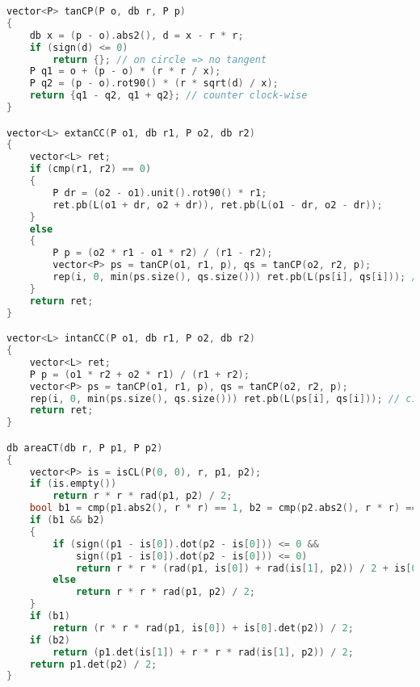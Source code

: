\begin{lstlisting}[language=C++]
vector<P> tanCP(P o, db r, P p)
{
    db x = (p - o).abs2(), d = x - r * r;
    if (sign(d) <= 0)
        return {}; // on circle => no tangent
    P q1 = o + (p - o) * (r * r / x);
    P q2 = (p - o).rot90() * (r * sqrt(d) / x);
    return {q1 - q2, q1 + q2}; // counter clock-wise
}

vector<L> extanCC(P o1, db r1, P o2, db r2)
{
    vector<L> ret;
    if (cmp(r1, r2) == 0)
    {
        P dr = (o2 - o1).unit().rot90() * r1;
        ret.pb(L(o1 + dr, o2 + dr)), ret.pb(L(o1 - dr, o2 - dr));
    }
    else
    {
        P p = (o2 * r1 - o1 * r2) / (r1 - r2);
        vector<P> ps = tanCP(o1, r1, p), qs = tanCP(o2, r2, p);
        rep(i, 0, min(ps.size(), qs.size())) ret.pb(L(ps[i], qs[i])); // c1 counter-clock wise
    }
    return ret;
}

vector<L> intanCC(P o1, db r1, P o2, db r2)
{
    vector<L> ret;
    P p = (o1 * r2 + o2 * r1) / (r1 + r2);
    vector<P> ps = tanCP(o1, r1, p), qs = tanCP(o2, r2, p);
    rep(i, 0, min(ps.size(), qs.size())) ret.pb(L(ps[i], qs[i])); // c1 counter-clock wise
    return ret;
}

db areaCT(db r, P p1, P p2)
{
    vector<P> is = isCL(P(0, 0), r, p1, p2);
    if (is.empty())
        return r * r * rad(p1, p2) / 2;
    bool b1 = cmp(p1.abs2(), r * r) == 1, b2 = cmp(p2.abs2(), r * r) == 1;
    if (b1 && b2)
    {
        if (sign((p1 - is[0]).dot(p2 - is[0])) <= 0 &&
            sign((p1 - is[0]).dot(p2 - is[0])) <= 0)
            return r * r * (rad(p1, is[0]) + rad(is[1], p2)) / 2 + is[0].det(is[1]) / 2;
        else
            return r * r * rad(p1, p2) / 2;
    }
    if (b1)
        return (r * r * rad(p1, is[0]) + is[0].det(p2)) / 2;
    if (b2)
        return (p1.det(is[1]) + r * r * rad(is[1], p2)) / 2;
    return p1.det(p2) / 2;
}


\end{lstlisting}
